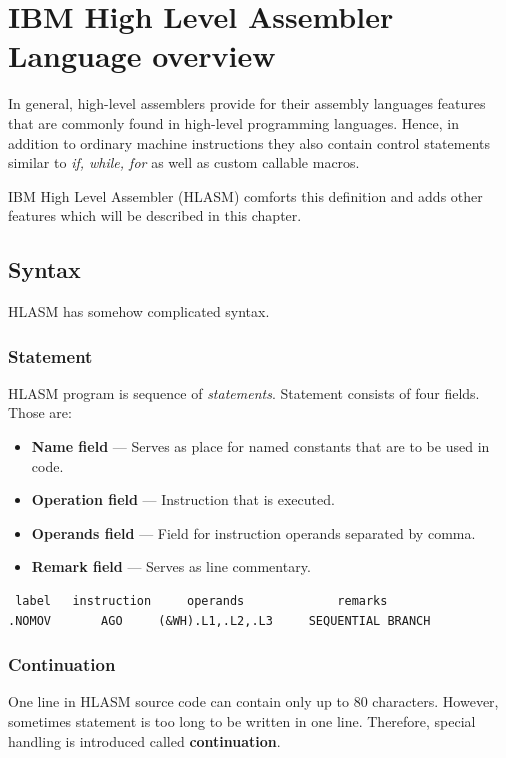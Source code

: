 \chapter{IBM High Level Assembler Language overview}

In general, high-level assemblers provide for their assembly languages features that are commonly found in high-level programming languages. Hence, in addition to ordinary machine instructions they also contain control statements similar to \textit{if, while, for} as well as custom callable macros.

IBM High Level Assembler (HLASM) comforts this definition and adds other features which will be described in this chapter.

\section{Syntax}

HLASM has somehow complicated syntax.

\subsection{Statement}

HLASM program is sequence of \textit{statements}. Statement consists of four fields. Those are:
\begin{itemize}
	\item \textbf{Name field} --- Serves as place for named constants that are to be used in code.
	
	\item \textbf{Operation field} --- Instruction that is executed.
	
	\item \textbf{Operands field} --- Field for instruction operands separated by comma.
	
	\item \textbf{Remark field} --- Serves as line commentary.
\end{itemize}
\begin{verbatim}
 label   instruction     operands             remarks
.NOMOV       AGO     (&WH).L1,.L2,.L3     SEQUENTIAL BRANCH
\end{verbatim}

\subsection{Continuation}

One line in HLASM source code can contain only up to 80 characters. However, sometimes statement is too long to be written in one line. Therefore, special handling is introduced called \textbf{continuation}.

